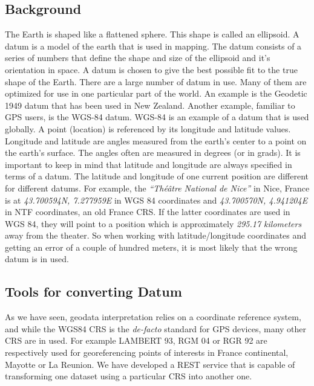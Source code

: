 \subsection{Background}
The Earth is shaped like a flattened sphere. This shape is called an ellipsoid. A datum is a model of the earth that is used in mapping. The datum consists of a series of numbers that define the shape and size of the ellipsoid and it's orientation in space. A datum is chosen to give the best possible fit to the true shape of the Earth.
There are a large number of datum in use. Many of them are optimized for use in one particular part of the world. An example is the Geodetic 1949 datum that has been used in New Zealand. Another example, familiar to GPS users, is the WGS-84 datum. WGS-84 is an example of a datum that is used globally.
A point (location) is referenced by its longitude and latitude values. Longitude and latitude are angles measured from the earth's center to a point on the earth's surface. The angles often are measured in degrees (or in grads). It is important to keep in mind that latitude and longitude are always specified in terms of a datum. The latitude and longitude of one current position are different for different datums. For example, the \emph{``Th\'{e}\^{a}tre National de Nice''} in Nice, France is at \emph{43.700594\degree N, 7.277959\degree E} in WGS 84 coordinates and \emph{43.700570\degree N, 4.941204\degree E} in NTF coordinates, an old France CRS. If the latter coordinates are used in WGS 84, they will point to a position which is approximately \textit{295.17 kilometers} away from the theater. So when working with latitude/longitude coordinates and getting an error of a couple of hundred meters, it is most likely that the wrong datum is in used.



\subsection{Tools for converting Datum}
As we have seen, geodata interpretation relies on a coordinate reference system, and while the WGS84 CRS is the \textit{de-facto} standard for GPS devices, many other CRS are in used. For example LAMBERT 93, RGM 04 or RGR 92 are respectively used for georeferencing points of interests in France continental, Mayotte or La Reunion. We have developed a REST service that is capable of transforming one dataset using a particular CRS into another one. 

